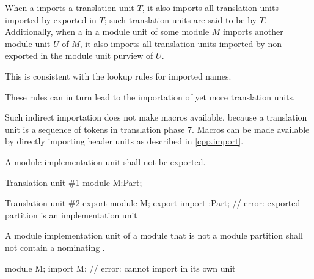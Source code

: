 \pnum
When a  imports
a translation unit $T$, it also imports
all translation units imported by
exported 
in $T$; such translation units are
said to be  by $T$.
Additionally, when a 
in a module unit of some module $M$ imports another module unit $U$ of $M$,
it also imports all translation units imported by
non-exported 
in the module unit purview of $U$.
\begin{footnote}
This is consistent
with the lookup rules for imported names.
\end{footnote}
These rules can in turn lead to the importation of yet more
translation units.
\begin{note}
Such indirect importation does not make macros available,
because a translation unit is
a sequence of tokens in translation phase 7.
Macros can be made available by directly importing header units
as described in \ref{cpp.import}.
\end{note}

\pnum
A module implementation unit shall not be exported.
\begin{example}
\begin{codeblocktu}{Translation unit \#1}
module M:Part;
\end{codeblocktu}

\begin{codeblocktu}{Translation unit \#2}
export module M;
export import :Part;    // error: exported partition  is an implementation unit
\end{codeblocktu}
\end{example}

\pnum
A module implementation unit of a module 
that is not a module partition
shall not contain a 
nominating .
\begin{example}
\begin{codeblock}
module M;
import M;               // error: cannot import  in its own unit
\end{codeblock}
\end{example}

